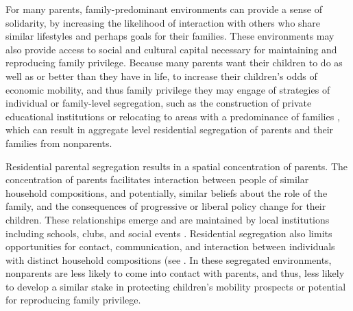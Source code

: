 For many parents, family-predominant environments can provide a sense of solidarity, by increasing the likelihood of interaction with others who share similar lifestyles and perhaps goals for their families. These environments may also provide access to social and cultural capital necessary for maintaining and reproducing family privilege. Because many parents want their children to do as well as or better than they have in life, to increase their children's odds of economic mobility, and thus family privilege they may engage of strategies of individual or family-level segregation, such as the construction of private educational institutions \citep{andrews_2002,nevin_and_bills_1976} or relocating to areas with a predominance of families \citep{owens_2016}, which can result in aggregate level residential segregation of parents and their families from nonparents. 



Residential parental segregation results in a spatial concentration of parents. The concentration of parents facilitates interaction between people of similar household compositions, and potentially, similar beliefs about the role of the family, and the consequences of progressive or liberal policy change for their children. These relationships emerge and are maintained by local institutions including schools, clubs, and social events \citep{beisel_1997}. Residential segregation also limits opportunities for contact, communication, and interaction between individuals with distinct household compositions (see \citep{blau_1977b,blau_1977a}. In these segregated environments, nonparents are less likely to come into contact with parents, and thus, less likely to develop a similar stake in protecting children's mobility prospects or potential for reproducing family privilege. 












